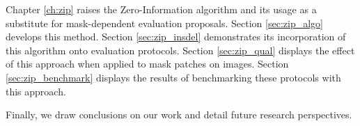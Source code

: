     Chapter \ref{ch:zip} raises the Zero-Information algorithm and its usage as a substitute
    for mask-dependent evaluation proposals. Section \ref{sec:zip_algo} develops this 
    method. Section \ref{sec:zip_insdel} demonstrates its incorporation of this 
    algorithm onto evaluation protocols. Section \ref{sec:zip_qual} displays
    the effect of this approach when applied to mask patches on images. Section 
    \ref{sec:zip_benchmark} displays the results of benchmarking these protocols 
    with this approach. 
    
    Finally, 
    we draw conclusions on our work and detail future research perspectives.

